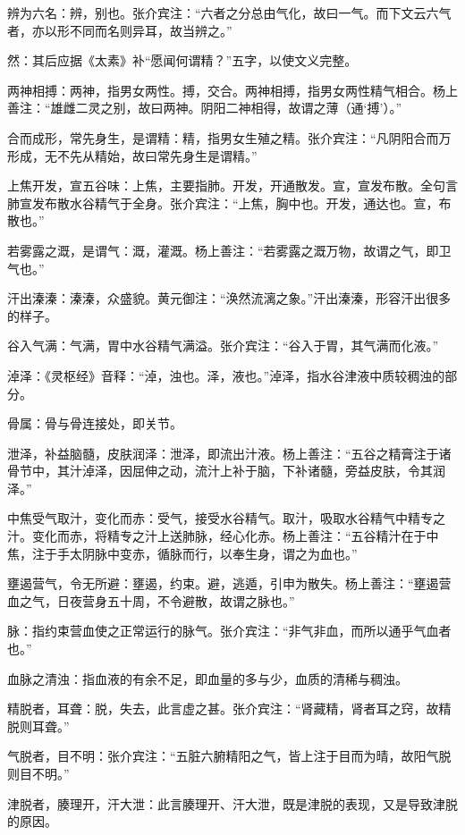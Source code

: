\documentclass[12pt]{ctexbook}
\begin{document}
\begin{jiaozhu}
  \item 辨为六名：辨，别也。张介宾注：“六者之分总由气化，故曰一气。而下文云六气者，亦以形不同而名则异耳，故当辨之。”
  \item 然：其后应据《太素》补“愿闻何谓精？”五字，以使文义完整。
  \item 两神相搏：两神，指男女两性。搏，交合。两神相搏，指男女两性精气相合。杨上善注：“雄雌二灵之别，故曰两神。阴阳二神相得，故谓之薄（通‘搏’）。”
  \item 合而成形，常先身生，是谓精：精，指男女生殖之精。张介宾注：“凡阴阳合而万形成，无不先从精始，故曰常先身生是谓精。”
  \item 上焦开发，宣五谷味：上焦，主要指肺。开发，开通散发。宣，宣发布散。全句言肺宣发布散水谷精气于全身。张介宾注：“上焦，胸中也。开发，通达也。宣，布散也。”
  \item 若雾露之溉，是谓气：溉，灌溉。杨上善注：“若雾露之溉万物，故谓之气，即卫气也。”
  \item 汗出溱溱：溱溱，众盛貌。黄元御注：“涣然流漓之象。”汗出溱溱，形容汗出很多的样子。
  \item 谷入气满：气满，胃中水谷精气满溢。张介宾注：“谷入于胃，其气满而化液。”
  \item 淖泽：《灵枢经》音释：“淖，浊也。泽，液也。”淖泽，指水谷津液中质较稠浊的部分。
  \item 骨属：骨与骨连接处，即关节。
  \item 泄泽，补益脑髓，皮肤润泽：泄泽，即流出汁液。杨上善注：“五谷之精膏注于诸骨节中，其汁淖泽，因屈伸之动，流汁上补于脑，下补诸髓，旁益皮肤，令其润泽。”
  \item 中焦受气取汁，变化而赤：受气，接受水谷精气。取汁，吸取水谷精气中精专之汁。变化而赤，将精专之汁上送肺脉，经心化赤。杨上善注：“五谷精汁在于中焦，注于手太阴脉中变赤，循脉而行，以奉生身，谓之为血也。”
  \item 壅遏营气，令无所避：壅遏，约束。避，逃遁，引申为散失。杨上善注：“壅遏营血之气，日夜营身五十周，不令避散，故谓之脉也。”
  \item 脉：指约束营血使之正常运行的脉气。张介宾注：“非气非血，而所以通乎气血者也。”
  \item 血脉之清浊：指血液的有余不足，即血量的多与少，血质的清稀与稠浊。
  \item 精脱者，耳聋：脱，失去，此言虚之甚。张介宾注：“肾藏精，肾者耳之窍，故精脱则耳聋。”
  \item 气脱者，目不明：张介宾注：“五脏六腑精阳之气，皆上注于目而为晴，故阳气脱则目不明。”
  \item 津脱者，腠理开，汗大泄：此言腠理开、汗大泄，既是津脱的表现，又是导致津脱的原因。

\end{jiaozhu}
\end{document}
